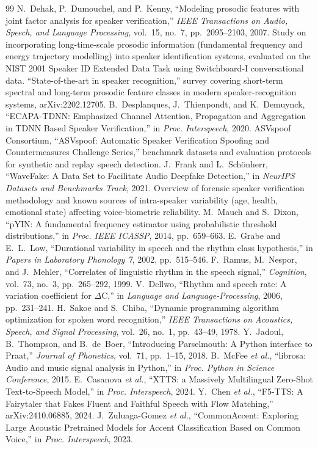 \documentclass[11pt,a4paper]{article}
\begin{document}
\clearpage
\begin{thebibliography}{99}
 N.~Dehak, P.~Dumouchel, and P.~Kenny, ``Modeling prosodic features with joint factor analysis for speaker verification,'' \emph{IEEE Transactions on Audio, Speech, and Language Processing}, vol.~15, no.~7, pp.~2095--2103, 2007.
 Study on incorporating long-time-scale prosodic information (fundamental frequency and energy trajectory modelling) into speaker identification systems, evaluated on the NIST 2001 Speaker ID Extended Data Task using Switchboard-I conversational data.
 ``State-of-the-art in speaker recognition,'' survey covering short-term spectral and long-term prosodic feature classes in modern speaker-recognition systems, arXiv:2202.12705.
 B.~Desplanques, J.~Thienpondt, and K.~Demuynck, ``ECAPA-TDNN: Emphasized Channel Attention, Propagation and Aggregation in TDNN Based Speaker Verification,'' in \emph{Proc. Interspeech}, 2020.
 ASVspoof Consortium, ``ASVspoof: Automatic Speaker Verification Spoofing and Countermeasures Challenge Series,'' benchmark datasets and evaluation protocols for synthetic and replay speech detection.
 J.~Frank and L.~Sch\"onherr, ``WaveFake: A Data Set to Facilitate Audio Deepfake Detection,'' in \emph{NeurIPS Datasets and Benchmarks Track}, 2021.
 Overview of forensic speaker verification methodology and known sources of intra-speaker variability (age, health, emotional state) affecting voice-biometric reliability.
 M.~Mauch and S.~Dixon, ``pYIN: A fundamental frequency estimator using probabilistic threshold distributions,'' in \emph{Proc. IEEE ICASSP}, 2014, pp.~659--663.
 E.~Grabe and E.~L.~Low, ``Durational variability in speech and the rhythm class hypothesis,'' in \emph{Papers in Laboratory Phonology 7}, 2002, pp.~515--546.
 F.~Ramus, M.~Nespor, and J.~Mehler, ``Correlates of linguistic rhythm in the speech signal,'' \emph{Cognition}, vol.~73, no.~3, pp.~265--292, 1999.
 V.~Dellwo, ``Rhythm and speech rate: A variation coefficient for $\Delta$C,'' in \emph{Language and Language-Processing}, 2006, pp.~231--241.
 H.~Sakoe and S.~Chiba, ``Dynamic programming algorithm optimization for spoken word recognition,'' \emph{IEEE Transactions on Acoustics, Speech, and Signal Processing}, vol.~26, no.~1, pp.~43--49, 1978.
 Y.~Jadoul, B.~Thompson, and B.~de~Boer, ``Introducing Parselmouth: A Python interface to Praat,'' \emph{Journal of Phonetics}, vol.~71, pp.~1--15, 2018.
 B.~McFee \emph{et al.}, ``librosa: Audio and music signal analysis in Python,'' in \emph{Proc. Python in Science Conference}, 2015.
 E.~Casanova \emph{et al.}, ``XTTS: a Massively Multilingual Zero-Shot Text-to-Speech Model,'' in \emph{Proc. Interspeech}, 2024.
 Y.~Chen \emph{et al.}, ``F5-TTS: A Fairytaler that Fakes Fluent and Faithful Speech with Flow Matching,'' arXiv:2410.06885, 2024.
 J.~Zuluaga-Gomez \emph{et al.}, ``CommonAccent: Exploring Large Acoustic Pretrained Models for Accent Classification Based on Common Voice,'' in \emph{Proc. Interspeech}, 2023.
\end{thebibliography}
\end{document}
